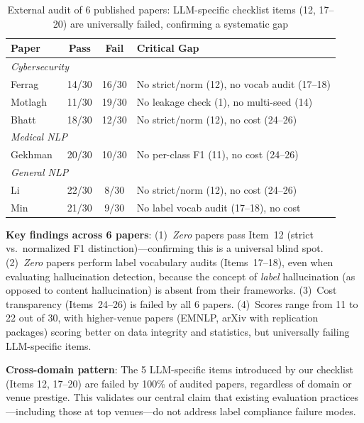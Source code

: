 \documentclass[review,3p]{elsarticle}
\begin{document}
\begin{table}[!ht]
\centering
\caption{External audit of 6 published papers: LLM-specific checklist items (12, 17--20) are universally failed, confirming a systematic gap}
\label{tab:audit}
\begin{tabular}{lccp{3.5cm}}
\toprule
\textbf{Paper} & \textbf{Pass} & \textbf{Fail} & \textbf{Critical Gap} \\
\midrule
\multicolumn{4}{l}{\emph{Cybersecurity}} \\
Ferrag~\cite{ferrag2024} & 14/30 & 16/30 & No strict/norm (12), no vocab audit (17--18) \\
Motlagh~\cite{motlagh2024} & 11/30 & 19/30 & No leakage check (1), no multi-seed (14) \\
Bhatt~\cite{secure2024} & 18/30 & 12/30 & No strict/norm (12), no cost (24--26) \\
\midrule
\multicolumn{4}{l}{\emph{Medical NLP}} \\
Gekhman~\cite{gekhman2024} & 20/30 & 10/30 & No per-class F1 (11), no cost (24--26) \\
\midrule
\multicolumn{4}{l}{\emph{General NLP}} \\
Li~\cite{li2024halueval} & 22/30 & 8/30 & No strict/norm (12), no cost (24--26) \\
Min~\cite{min2023factscore} & 21/30 & 9/30 & No label vocab audit (17--18), no cost \\
\bottomrule
\end{tabular}
\end{table}

\textbf{Key findings across 6 papers}: (1)~\emph{Zero} papers pass Item~12 (strict vs.\ normalized F1 distinction)---confirming this is a universal blind spot. (2)~\emph{Zero} papers perform label vocabulary audits (Items~17--18), even when evaluating hallucination detection, because the concept of \emph{label} hallucination (as opposed to content hallucination) is absent from their frameworks. (3)~Cost transparency (Items~24--26) is failed by all 6 papers. (4)~Scores range from 11 to 22 out of 30, with higher-venue papers (EMNLP, arXiv with replication packages) scoring better on data integrity and statistics, but universally failing LLM-specific items.

\textbf{Cross-domain pattern}: The 5 LLM-specific items introduced by our checklist (Items 12, 17--20) are failed by 100\% of audited papers, regardless of domain or venue prestige. This validates our central claim that existing evaluation practices---including those at top venues---do not address label compliance failure modes.
\end{document}
